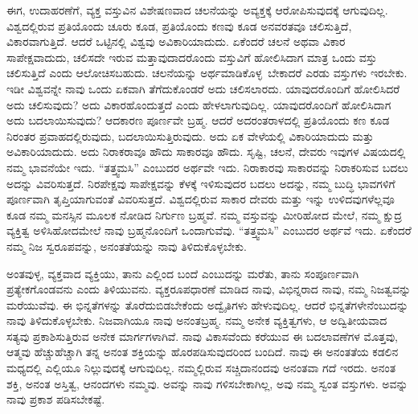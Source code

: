 \vskip 0.5cm

ಈಗ, ಉದಾಹರಣೆಗೆ, ವ್ಯಕ್ತ ವಸ್ತುವಿನ ವಿಶೇಷಣವಾದ ಚಲನೆಯನ್ನು ಅವ್ಯಕ್ತಕ್ಕೆ ಆರೋಪಿಸುವುದಕ್ಕೆ ಆಗುವುದಿಲ್ಲ. ವಿಶ್ವದಲ್ಲಿರುವ ಪ್ರತಿಯೊಂದು ಚೂರು ಕೂಡ, ಪ್ರತಿಯೊಂದು ಕಣವು ಕೂಡ ಅನವರತವೂ ಚಲಿಸುತ್ತಿದೆ, ವಿಕಾರವಾಗುತ್ತಿದೆ. ಆದರೆ ಒಟ್ಟಿನಲ್ಲಿ ವಿಶ್ವವು ಅವಿಕಾರಿಯಾದುದು. ಏಕೆಂದರೆ ಚಲನೆ ಅಥವಾ ವಿಕಾರ ಸಾಪೇಕ್ಷವಾದುದು, ಚಲಿಸದೇ ಇರುವ ಮತ್ತಾವುದಾದರೊಂದು ವಸ್ತುವಿಗೆ ಹೋಲಿಸಿದಾಗ ಮಾತ್ರ ಒಂದು ವಸ್ತು ಚಲಿಸುತ್ತಿದೆ ಎಂದು ಆಲೋಚಿಸಬಹುದು. ಚಲನೆಯನ್ನು ಅರ್ಥಮಾಡಿಕೊಳ್ಳ\break\ ಬೇಕಾದರೆ ಎರಡು ವಸ್ತುಗಳು ಇರಬೇಕು. ಇಡೀ ವಿಶ್ವವನ್ನೇ ನಾವು ಒಂದು ಏಕವಾಗಿ ತೆಗೆದುಕೊಂಡರೆ ಅದು ಚಲಿಸಲಾರದು. ಯಾವುದರೊಂದಿಗೆ ಹೋಲಿಸಿದರೆ ಅದು ಚಲಿಸುವುದು? ಅದು ವಿಕಾರಹೊಂದುತ್ತದೆ ಎಂದು ಹೇಳಲಾಗುವುದಿಲ್ಲ. ಯಾವುದರೊಂದಿಗೆ ಹೋಲಿಸಿದಾಗ ಅದು ಬದಲಾಯಿಸುವುದು? ಆದಕಾರಣ ಪೂರ್ಣವೇ ಬ್ರಹ್ಮ. ಆದರೆ ಅದರಂತರಾಳದಲ್ಲಿ ಪ್ರತಿಯೊಂದು ಕಣ ಕೂಡ ನಿರಂತರ ಪ್ರವಾಹದಲ್ಲಿರುವುದು, ಬದಲಾಯಿಸುತ್ತಿರುವುದು. ಅದು ಏಕ ವೇಳೆಯಲ್ಲಿ ವಿಕಾರಿಯಾದುದು ಮತ್ತು ಅವಿಕಾರಿಯಾದುದು. ಅದು ನಿರಾಕರಾವೂ ಹೌದು ಸಾಕಾರವೂ ಹೌದು. ಸೃಷ್ಟಿ, ಚಲನೆ, ದೇವರು ಇವುಗಳ ವಿಷಯದಲ್ಲಿ ನಮ್ಮ ಭಾವನೆಯೇ ಇದು. “ತತ್ತ್ವಮಸಿ” ಎಂಬುದರ ಅರ್ಥವೇ ಇದು. ನಿರಾಕಾರವು ಸಾಕಾರವನ್ನು ನಿರಾಕರಿಸುವ ಬದಲು ಅದನ್ನು ವಿವರಿಸುತ್ತದೆ. ನಿರಪೇಕ್ಷವು ಸಾಪೇಕ್ಷವನ್ನು ಕೆಳಕ್ಕೆ ಇಳಿಸುವುದರ ಬದಲು ಅದನ್ನು, ನಮ್ಮ ಬುದ್ಧಿ ಭಾವಗಳಿಗೆ ಪೂರ್ಣವಾಗಿ ತೃಪ್ತಿಯಾಗುವಂತೆ ವಿವರಿಸುತ್ತದೆ. ವಿಶ್ವದಲ್ಲಿರುವ ಸಾಕಾರ ದೇವರು ಮತ್ತು ಇನ್ನು ಉಳಿದವುಗಳೆಲ್ಲವೂ ಕೂಡ ನಮ್ಮ ಮನಸ್ಸಿನ ಮೂಲಕ ನೋಡಿದ ನಿರ್ಗುಣ ಬ್ರಹ್ಮವೆ. ನಮ್ಮ ವಸ್ತುವನ್ನು ಮೀರಿಹೋದ ಮೇಲೆ, ನಮ್ಮ ಕ್ಷುದ್ರ ವ್ಯಕ್ತಿತ್ವ ಅಳಿಸಿಹೋದಮೇಲೆ ನಾವು ಬ್ರಹ್ಮನೊಂದಿಗೆ ಒಂದಾಗುವೆವು. “ತತ್ತ್ವಮಸಿ” ಎಂಬುದರ ಅರ್ಥವೆ ಇದು. ಏಕೆಂದರೆ ನಮ್ಮ ನಿಜ ಸ್ವರೂಪವನ್ನು, ಅನಂತತೆಯನ್ನು ನಾವು ತಿಳಿದುಕೊಳ್ಳಬೇಕು. 

\vskip 0.5cm

ಅಂತವುಳ್ಳ, ವ್ಯಕ್ತವಾದ ವ್ಯಕ್ತಿಯು, ತಾನು ಎಲ್ಲಿಂದ ಬಂದೆ ಎಂಬುದನ್ನು ಮರೆತು, ತಾನು ಸಂಪೂರ್ಣವಾಗಿ ಪ್ರತ್ಯೇಕಗೊಂಡವನು ಎಂದು ತಿಳಿಯುವನು. ವ್ಯಕ್ತರೂಪಧಾರಣೆ ಮಾಡಿದ ನಾವು, ವಿಭಿನ್ನರಾದ ನಾವು, ನಮ್ಮ ನಿಜತ್ವವನ್ನು ಮರೆಯುವೆವು. ಈ ಭಿನ್ನತೆಗಳನ್ನು ತೊರೆದುಬಿಡಬೇಕೆಂದು ಅದ್ವೈತಿಗಳು ಹೇಳುವುದಿಲ್ಲ. ಆದರೆ ಭಿನ್ನತೆಗಳೇನೆಂಬುದನ್ನು ನಾವು ತಿಳಿದುಕೊಳ್ಳಬೇಕು. ನಿಜವಾಗಿಯೂ ನಾವು ಅನಂತಬ್ರಹ್ಮ. ನಮ್ಮ ಅನೇಕ ವ್ಯಕ್ತಿತ್ವಗಳು, ಆ ಅದ್ವಿತೀಯವಾದ ಸತ್ಯವು ಪ್ರಕಾಶಿಸುತ್ತಿರುವ ಅನೇಕ ಮಾರ್ಗಗಳಾಗಿವೆ. ನಾವು ವಿಕಾಸವೆಂದು ಕರೆಯುವ ಈ ಬದಲಾವಣೆಗಳ ಮೊತ್ತವು, ಆತ್ಮವು ಹೆಚ್ಚುಹೆಚ್ಚಾಗಿ ತನ್ನ ಅನಂತ ಶಕ್ತಿಯನ್ನು ಹೊರಪಡಿಸುವುದರಿಂದ ಬಂದಿದೆ. ನಾವು ಈ ಅನಂತತೆಯ ಕಡಲಿನ ಮಧ್ಯದಲ್ಲಿ ಎಲ್ಲಿಯೂ ನಿಲ್ಲುವುದಕ್ಕೆ ಆಗುವುದಿಲ್ಲ. ನಮ್ಮಲ್ಲಿರುವ ಸಚ್ಚಿದಾನಂದವು ಅನಂತವಾ ಗದೆ ಇರದು. ಅನಂತ ಶಕ್ತಿ, ಅನಂತ ಅಸ್ತಿತ್ವ, ಆನಂದಗಳು ನಮ್ಮವು. ಅವನ್ನು ನಾವು ಗಳಿಸಬೇಕಾಗಿಲ್ಲ, ಅವು ನಮ್ಮ ಸ್ವಂತ ವಸ್ತುಗಳು. ಅವನ್ನು ನಾವು ಪ್ರಕಾಶ ಪಡಿಸಬೇಕಷ್ಟೆ. 

\vskip 0.3cm



